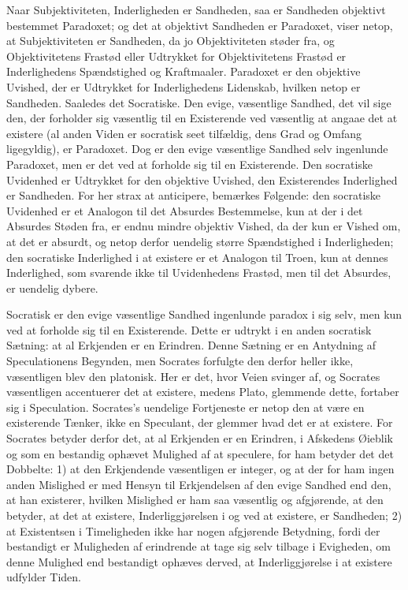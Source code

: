 \documentclass[12pt,a4paper]{article}
\begin{document}
Naar Subjektiviteten, Inderligheden er Sandheden, saa er Sandheden objektivt bestemmet Paradoxet; og det at objektivt Sandheden er Paradoxet, viser netop, at Subjektiviteten er Sandheden, da jo Objektiviteten støder fra, og Objektivitetens Frastød eller Udtrykket for Objektivitetens Frastød er Inderlighedens Spændstighed og Kraftmaaler. Paradoxet er den objektive Uvished, der er Udtrykket for Inderlighedens Lidenskab, hvilken netop er Sandheden. Saaledes det Socratiske. Den evige, væsentlige Sandhed, det vil sige den, der forholder sig væsentlig til en Existerende ved væsentlig at angaae det at existere (al anden Viden er socratisk seet tilfældig, dens Grad og Omfang ligegyldig), er Paradoxet. Dog er den evige væsentlige Sandhed selv ingenlunde Paradoxet, men er det ved at forholde sig til en Existerende. Den socratiske Uvidenhed er Udtrykket for den objektive Uvished, den Existerendes Inderlighed er Sandheden. For her strax at anticipere, bemærkes Følgende: den socratiske Uvidenhed er et Analogon til det Absurdes Bestemmelse, kun at der i det Absurdes Støden fra, er endnu mindre objektiv Vished, da der kun er Vished om, at det er absurdt, og netop derfor uendelig større Spændstighed i Inderligheden; den socratiske Inderlighed i at existere er et Analogon til Troen, kun at dennes Inderlighed, som svarende ikke til Uvidenhedens Frastød, men til det Absurdes, er uendelig dybere.

Socratisk er den evige væsentlige Sandhed ingenlunde paradox i sig selv, men kun ved at forholde sig til en Existerende. Dette er udtrykt i en anden socratisk Sætning: at al Erkjenden er en Erindren. Denne Sætning er en Antydning af Speculationens Begynden, men Socrates forfulgte den derfor heller ikke, væsentligen blev den platonisk. Her er det, hvor Veien svinger af, og Socrates væsentligen accentuerer det at existere, medens Plato, glemmende dette, fortaber sig i Speculation. Socrates's uendelige Fortjeneste er netop den at være en existerende Tænker, ikke en Speculant, der glemmer hvad det er at existere. For Socrates betyder derfor det, at al Erkjenden er en Erindren, i Afskedens Øieblik og som en bestandig ophævet Mulighed af at speculere, for ham betyder det det Dobbelte: 1) at den Erkjendende væsentligen er integer, og at der for ham ingen anden Mislighed er med Hensyn til Erkjendelsen af den evige Sandhed end den, at han existerer, hvilken Mislighed er ham saa væsentlig og afgjørende, at den betyder, at det at existere, Inderliggjørelsen i og ved at existere, er Sandheden; 2) at Existentsen i Timeligheden ikke har nogen afgjørende Betydning, fordi der bestandigt er Muligheden af erindrende at tage sig selv tilbage i Evigheden, om denne Mulighed end bestandigt ophæves derved, at Inderliggjørelse i at existere udfylder Tiden.
\end{document}
